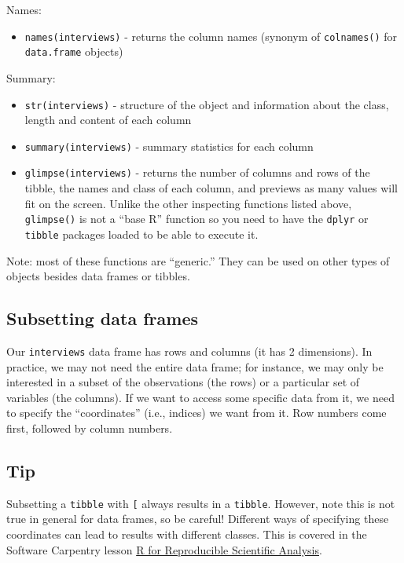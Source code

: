 \documentclass[
]{article}
\providecommand{\tightlist}{%
  \setlength{\itemsep}{0pt}\setlength{\parskip}{0pt}}
\begin{document}
Names:

\begin{itemize}
\tightlist
\item
  \texttt{names(interviews)} - returns the column names (synonym of
  \texttt{colnames()} for \texttt{data.frame} objects)
\end{itemize}

Summary:

\begin{itemize}
\tightlist
\item
  \texttt{str(interviews)} - structure of the object and information
  about the class, length and content of each column
\item
  \texttt{summary(interviews)} - summary statistics for each column
\item
  \texttt{glimpse(interviews)} - returns the number of columns and rows
  of the tibble, the names and class of each column, and previews as
  many values will fit on the screen. Unlike the other inspecting
  functions listed above, \texttt{glimpse()} is not a ``base R''
  function so you need to have the \texttt{dplyr} or \texttt{tibble}
  packages loaded to be able to execute it.
\end{itemize}

Note: most of these functions are ``generic.'' They can be used on other
types of objects besides data frames or tibbles.

\subsection{Subsetting data frames}\label{subsetting-data-frames}

Our \texttt{interviews} data frame has rows and columns (it has 2
dimensions). In practice, we may not need the entire data frame; for
instance, we may only be interested in a subset of the observations (the
rows) or a particular set of variables (the columns). If we want to
access some specific data from it, we need to specify the
``coordinates'' (i.e., indices) we want from it. Row numbers come first,
followed by column numbers.

\subsection{Tip}\label{tip}

Subsetting a \texttt{tibble} with \texttt{{[}} always results in a
\texttt{tibble}. However, note this is not true in general for data
frames, so be careful! Different ways of specifying these coordinates
can lead to results with different classes. This is covered in the
Software Carpentry lesson
\href{https://swcarpentry.github.io/r-novice-gapminder/}{R for
Reproducible Scientific Analysis}.
\end{document}
